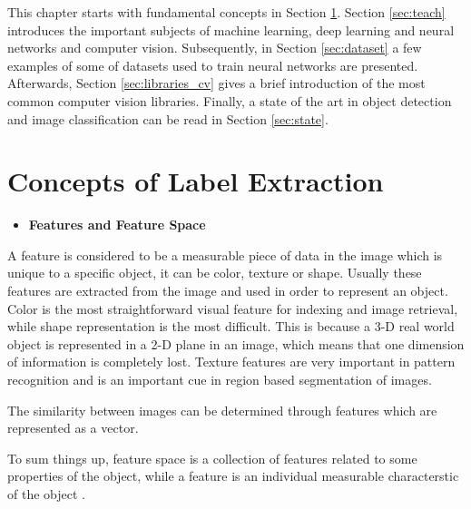 \par This chapter starts with fundamental concepts in Section \ref{sec:fundamental}. Section \ref{sec:teach} introduces the important subjects of machine learning, deep learning and neural networks and computer vision. Subsequently, in Section \ref{sec:dataset} a few examples of some of datasets used to train neural networks are presented. Afterwards, Section \ref{sec:libraries_cv} gives a brief introduction of the most common computer vision libraries.  Finally, a state of the art in object detection and image classification can be read in Section \ref{sec:state}.

\newpage

    
\section{Concepts of Label Extraction}
\label{sec:fundamental}




\begin{itemize}
    \item \textbf{Features and Feature Space}
\end{itemize}

    \label{sec:featurespace}
    \par A feature is considered to be a measurable piece of data in the image which is unique to a specific object, it can be color, texture or shape. Usually these features are extracted from the image and used in order to represent an object. Color is the most straightforward visual feature for indexing and image retrieval, while shape representation is the most difficult. This is because a 3-D real world object is represented in a 2-D plane in an image, which means that one dimension of information is completely lost. Texture features are very important in pattern recognition and is an important cue in region based segmentation of images.

    \par The similarity between images can be determined through features which are represented as a vector. 

    \par To sum things up, feature space is a collection of features related to some properties of the object, while a feature is an individual measurable characterstic of the object \cite{Tiwari2013}.

